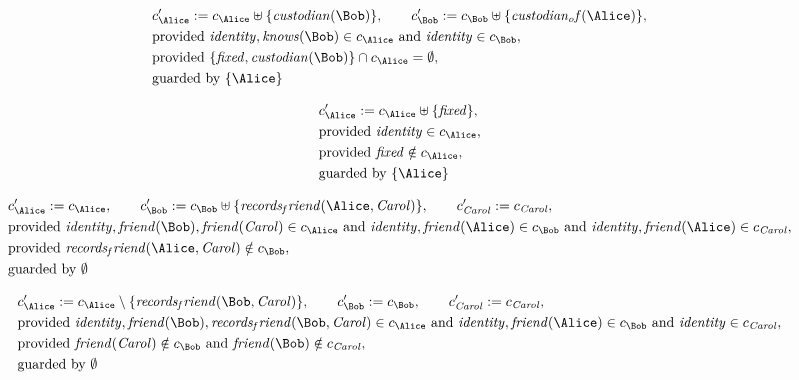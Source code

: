 \begin{align*}
&
c'_
{
\Alice
}
 := 
c_
{
\Alice
}
 \uplus 
\{
\mathit{
custodian
}
(
\Bob
)
\}
, \qquad 
c'_
{
\Bob
}
 := 
c_
{
\Bob
}
 \uplus 
\{
\mathit{
custodian_of
}
(
\Alice
)
\}
,\\
&
\text{provided } 
\mathit{
identity
}
,
\mathit{
knows
}
(
\Bob
)
 \in c_
{
\Alice
}
 \text{ and } 
\mathit{
identity
}
 \in c_
{
\Bob
}
,\\
&
\text{provided } 
\{
\mathit{
fixed
}
,
\mathit{
custodian
}
(
\Bob
)
\}
 \cap c_
{
\Alice
}
 = \emptyset
,\\
&
\text{guarded by } \{
\Alice
\}
\end{align*}

\begin{align*}
&
c'_
{
\Alice
}
 := 
c_
{
\Alice
}
 \uplus 
\{
\mathit{
fixed
}
\}
,\\
&
\text{provided } 
\mathit{
identity
}
 \in c_
{
\Alice
}
,\\
&
\text{provided } 
\mathit{
fixed
}
 \notin c_
{
\Alice
}
,\\
&
\text{guarded by } \{
\Alice
\}
\end{align*}

\begin{align*}
&
c'_
{
\Alice
}
 := 
c_
{
\Alice
}
, \qquad 
c'_
{
\Bob
}
 := 
c_
{
\Bob
}
 \uplus 
\{
\mathit{
records_friend
}
(
\Alice
,
\mathit{Carol}
)
\}
, \qquad 
c'_
{
\mathit{Carol}
}
 := 
c_
{
\mathit{Carol}
}
,\\
&
\text{provided } 
\mathit{
identity
}
,
\mathit{
friend
}
(
\Bob
)
,
\mathit{
friend
}
(
\mathit{Carol}
)
 \in c_
{
\Alice
}
 \text{ and } 
\mathit{
identity
}
,
\mathit{
friend
}
(
\Alice
)
 \in c_
{
\Bob
}
 \text{ and } 
\mathit{
identity
}
,
\mathit{
friend
}
(
\Alice
)
 \in c_
{
\mathit{Carol}
}
,\\
&
\text{provided } 
\mathit{
records_friend
}
(
\Alice
,
\mathit{Carol}
)
 \notin c_
{
\Bob
}
,\\
&
\text{guarded by } \emptyset
\end{align*}

\begin{align*}
&
c'_
{
\Alice
}
 := 
c_
{
\Alice
}
 \setminus 
\{
\mathit{
records_friend
}
(
\Bob
,
\mathit{Carol}
)
\}
, \qquad 
c'_
{
\Bob
}
 := 
c_
{
\Bob
}
, \qquad 
c'_
{
\mathit{Carol}
}
 := 
c_
{
\mathit{Carol}
}
,\\
&
\text{provided } 
\mathit{
identity
}
,
\mathit{
friend
}
(
\Bob
)
,
\mathit{
records_friend
}
(
\Bob
,
\mathit{Carol}
)
 \in c_
{
\Alice
}
 \text{ and } 
\mathit{
identity
}
,
\mathit{
friend
}
(
\Alice
)
 \in c_
{
\Bob
}
 \text{ and } 
\mathit{
identity
}
 \in c_
{
\mathit{Carol}
}
,\\
&
\text{provided } 
\mathit{
friend
}
(
\mathit{Carol}
)
 \notin c_
{
\Bob
}
 \text{ and } 
\mathit{
friend
}
(
\Bob
)
 \notin c_
{
\mathit{Carol}
}
,\\
&
\text{guarded by } \emptyset
\end{align*}
